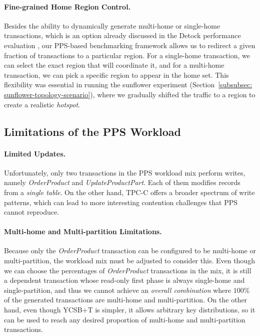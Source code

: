 \paragraph{Fine-grained Home Region Control.}
Besides the ability to dynamically generate multi-home or single-home transactions, which is an option already discussed in the Detock performance evaluation \cite{nguyen2023detock}, our PPS-based benchmarking framework allows us to redirect a given fraction of transactions to a particular region. For a single-home transaction, we can select the exact region that will coordinate it, and for a multi-home transaction, we can pick a specific region to appear in the home set. This flexibility was essential in running the sunflower experiment (Section~\ref{subsubsec: sunflower-topology-scenario}), where we gradually shifted the traffic to a region to create a realistic \textit{hotspot}.

\subsection{Limitations of the PPS Workload}
\label{subsec: limitations-of-the-pps-workload}
\paragraph{Limited Updates.}
Unfortunately, only two transactions in the PPS workload mix perform writes, namely \textit{OrderProduct} and \textit{UpdateProductPart}. Each of them modifies records from a \textit{single table}. On the other hand, TPC-C offers a broader spectrum of write patterns, which can lead to more interesting contention challenges that PPS cannot reproduce.

\paragraph{Multi-home and Multi-partition Limitations.}
Because only the \textit{OrderProduct} transaction can be configured to be multi-home or multi-partition, the workload mix must be adjusted to consider this. Even though we can choose the percentages of \textit{OrderProduct} transactions in the mix, it is still a dependent transaction whose read-only first phase is always single-home and single-partition, and thus we cannot achieve an \textit{overall combination} where $100\%$ of the generated transactions are multi-home and multi-partition. On the other hand, even though YCSB+T is simpler, it allows arbitrary key distributions, so it can be used to reach any desired proportion of multi-home and multi-partition transactions.